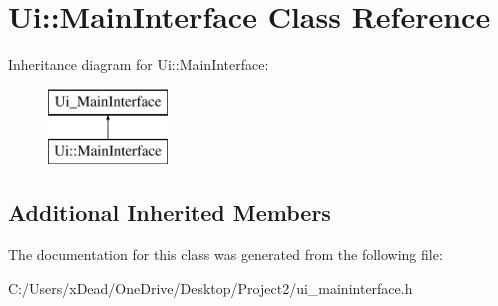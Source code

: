\hypertarget{class_ui_1_1_main_interface}{}\section{Ui\+:\+:Main\+Interface Class Reference}
\label{class_ui_1_1_main_interface}
Inheritance diagram for Ui\+:\+:Main\+Interface\+:\begin{figure}[H]
\begin{center}
\leavevmode
\includegraphics[height=2.000000cm]{class_ui_1_1_main_interface}
\end{center}
\end{figure}
\subsection*{Additional Inherited Members}


The documentation for this class was generated from the following file\+:\begin{DoxyCompactItemize}
\item 
C\+:/\+Users/x\+Dead/\+One\+Drive/\+Desktop/\+Project2/ui\+\_\+maininterface.\+h\end{DoxyCompactItemize}

